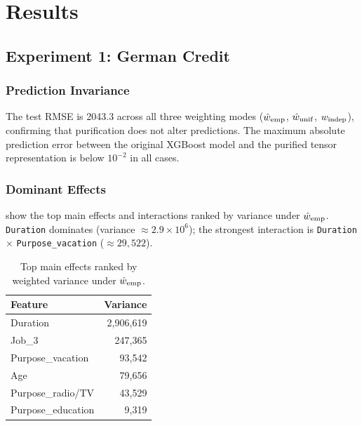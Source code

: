 \chapter{Results}\label{chap:results}

\section{Experiment 1: German Credit}

\subsection{Prediction Invariance}

The test \gls{RMSE} is 2043.3 across all three weighting modes ($\hat{w}_{\mathrm{emp}}$, $\hat{w}_{\mathrm{unif}}$, $w_{\mathrm{indep}}$), confirming that purification does not alter predictions.
The maximum absolute prediction error between the original XGBoost model and the purified tensor representation is below $10^{-2}$ in all cases.

\subsection{Dominant Effects}

 show the top main effects and interactions ranked by variance under $\hat{w}_{\mathrm{emp}}$.
\texttt{Duration} dominates (variance $\approx 2.9 \times 10^6$); the strongest interaction is \texttt{Duration} $\times$ \texttt{Purpose\_vacation} ($\approx 29{,}522$).

\begin{table}[H]
\centering
\small
\caption[Top main effects in the German Credit experiment.]{Top main effects ranked by weighted variance under $\hat{w}_{\mathrm{emp}}$.}
\begin{tabular}{lr}
\toprule
\textbf{Feature} & \textbf{Variance} \\
\midrule
Duration & 2,906,619 \\
Job\_3 & 247,365 \\
Purpose\_vacation & 93,542 \\
Age & 79,656 \\
Purpose\_radio/TV & 43,529 \\
Purpose\_education & 9,319 \\
\bottomrule
\end{tabular}
\label{tab:german-mains}
\end{table}

